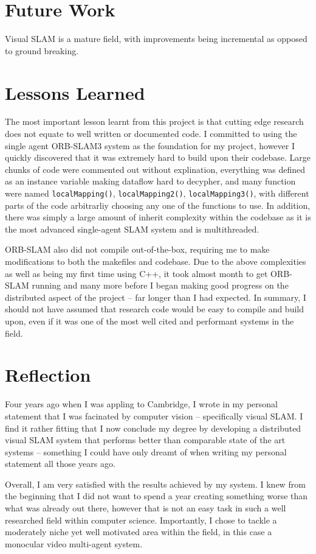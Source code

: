 

\label{sec:5}

\section{Future Work}
\label{sec:future-work}
Visual SLAM is a mature field, with improvements being incremental as opposed to ground breaking.

\section{Lessons Learned}
\label{sec:lessons-learned}
The most important lesson learnt from this project is that cutting edge research does not equate to well written or documented code. I committed to using the single agent ORB-SLAM3 system as the foundation for my project, however I quickly discovered that it was extremely hard to build upon their codebase. Large chunks of code were commented out without explination, everything was defined as an instance variable making dataflow hard to decypher, and many function were named \texttt{localMapping()}, \texttt{localMapping2()}, \texttt{localMapping3()}, with different parts of the code arbitrarliy choosing any one of the functions to use. In addition, there was simply a large amount of inherit complexity within the codebase as it is the most advanced single-agent SLAM system and is multithreaded.

ORB-SLAM also did not compile out-of-the-box, requiring me to make modifications to both the makefiles and codebase. Due to the above complexities as well as being my first time using C++, it took almost month to get ORB-SLAM running and many more before I began making good progress on the distributed aspect of the project – far longer than I had expected. In summary, I should not have assumed that research code would be easy to compile and build upon, even if it was one of the most well cited and performant systems in the field.

\section{Reflection}
\label{sec:reflection}

Four years ago when I was appling to Cambridge, I wrote in my personal statement that I was facinated by computer vision – specifically visual SLAM. I find it rather fitting that I now conclude my degree by developing a distributed visual SLAM system that performs better than comparable state of the art systems – something I could have only dreamt of when writing my personal statement all those years ago.

Overall, I am very satisfied with the results achieved by my system. I knew from the beginning that I did not want to spend a year creating something worse than what was already out there, however that is not an easy task in such a well researched field within computer science. Importantly, I chose to tackle a moderately niche yet well motivated area within the field, in this case a monocular video multi-agent system.